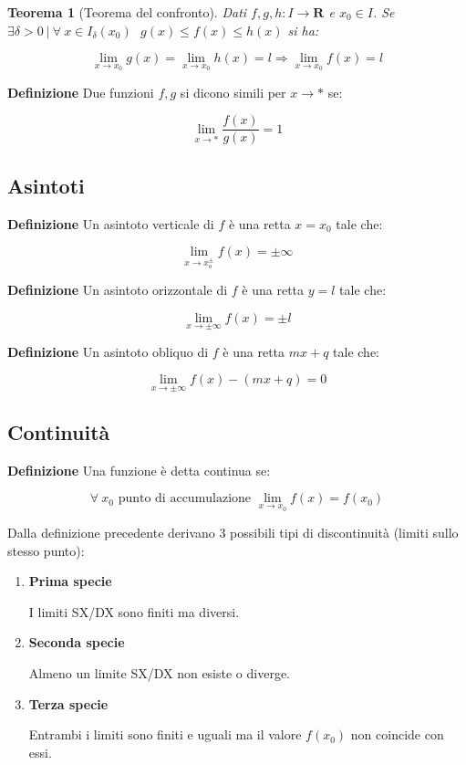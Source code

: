 \documentclass{article}
\newtheorem{theorem}{Teorema}
\begin{document}
\begin{theorem}[Teorema del confronto]
Dati $f,g,h:I\rightarrow\mathbf{R}$ e $x_0\in I$. Se $\exists\delta>0\ |\ \forall\ x\in I_\delta(x_0)\ \ \ g(x)\leq f(x)\leq h(x)$ si ha:

$$\lim_{x\rightarrow x_0}g(x)=\lim_{x\rightarrow x_0}h(x)=l\Rightarrow\lim_{x\rightarrow x_0}f(x)=l$$\newline

\end{theorem}

\noindent\textbf{Definizione} Due funzioni $f,g$ si dicono simili per $x\rightarrow*$ se:

$$\lim_{x\rightarrow*}\frac{f(x)}{g(x)}=1$$\newline

\subsection{Asintoti}

\textbf{Definizione} Un asintoto verticale di $f$ è una retta $x=x_0$ tale che:

$$\lim_{x\rightarrow x_o^\pm}f(x)=\pm\infty$$\newline

\noindent\textbf{Definizione} Un asintoto orizzontale di $f$ è una retta $y=l$ tale che:

$$\lim_{x\rightarrow \pm\infty}f(x)=\pm l$$\newline

\noindent\textbf{Definizione} Un asintoto obliquo di $f$ è una retta $mx+q$ tale che:

$$\lim_{x\rightarrow \pm\infty}f(x)-(mx+q)=0$$\newline

\subsection{Continuità}

\textbf{Definizione} Una funzione è detta continua se:

$$\forall\ x_0 \text{ punto di accumulazione }\lim_{x\rightarrow x_0}f(x)=f(x_0)$$\newline

\newpage

\noindent Dalla definizione precedente derivano 3 possibili tipi di discontinuità (limiti sullo stesso punto):
\begin{enumerate}
    \item \textbf{Prima specie}

    I limiti SX/DX sono finiti ma diversi.

    \item \textbf{Seconda specie}

    Almeno un limite SX/DX non esiste o diverge.

    \item \textbf{Terza specie}

    Entrambi i limiti sono finiti e uguali ma il valore $f(x_0)$ non coincide con essi.
    
\end{enumerate}
\end{document}
